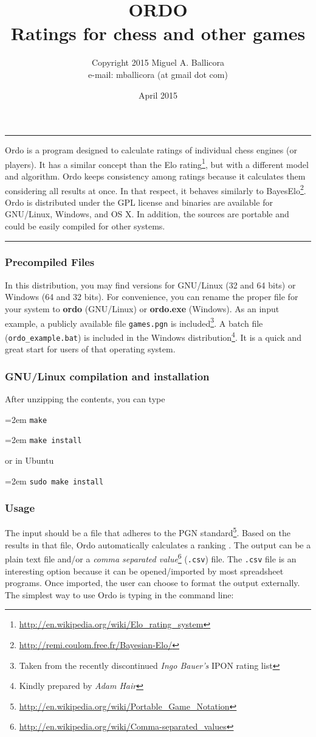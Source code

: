 \documentclass[12pt]{article}
\title{ORDO  \\ Ratings for chess and other games}
\author{Copyright \cpyrht{} 2015 Miguel A. Ballicora\\e-mail: mballicora (at gmail dot com)}
\date{April 2015}
\renewenvironment{abstract}{%
\hfill\begin{minipage}{0.95\textwidth}
\rule{\textwidth}{1pt}}
{\par\noindent\rule{\textwidth}{1pt}\end{minipage}}
\newcommand{\rgstrd} {\textsuperscript{\textregistered{}}}
\newcommand{\person} [1] {\textit{#1}}
\newcommand{\filename} [1] {\texttt{#1}}
\newcommand{\cmdln}[1]{
	\par
	\begingroup
		\leftskip=2em
		\addtolength{\rightskip}{0em}
		\noindent \small{\texttt{#1}}
		\par
	\endgroup
}
\begin{document}
   \maketitle

\begin{abstract}
Ordo is a program designed to calculate ratings of individual chess engines (or players).
It has a similar concept than the Elo rating\footnote{\url{http://en.wikipedia.org/wiki/Elo_rating_system}}, but with a different model and algorithm. 
Ordo keeps consistency among ratings because it calculates them considering all results at once.
In that respect, it behaves similarly to BayesElo\footnote{\url{http://remi.coulom.free.fr/Bayesian-Elo/}}.
Ordo is distributed under the GPL license and binaries are available for GNU/Linux, Windows\rgstrd{}, and OS X.
In addition, the sources are portable and could be easily compiled for other systems. 
\end{abstract}

\subsubsection*{Precompiled Files}
In this distribution, you may find versions for GNU/Linux (32 and 64 bits) or Windows\rgstrd{} (64 and 32 bits). 
For convenience, you can rename the proper file for your system to \textbf{ordo} (GNU/Linux) or \textbf{ordo.exe} (Windows\rgstrd{}). 
As an input example, a publicly available file \filename{games.pgn} is included\footnote{Taken from the recently discontinued \person{Ingo Bauer's} IPON rating list}. 
A batch file (\filename{ordo\_example.bat}) is included in the Windows\rgstrd{} distribution\footnote{Kindly prepared by \person{Adam Hair}}. 
It is a quick and great start for users of that operating system.

\subsubsection*{GNU/Linux compilation and installation}
After unzipping the contents, you can type
\cmdln{make}
\cmdln{make install}
or in Ubuntu
\cmdln{sudo make install}

\subsubsection*{Usage}
The input should be a file that adheres to the PGN standard\footnote{\url{http://en.wikipedia.org/wiki/Portable_Game_Notation}}. 
Based on the results in that file, Ordo automatically calculates a ranking . 
The output can be a plain text file and/or a \textit{comma separated value}\footnote{\url{http://en.wikipedia.org/wiki/Comma-separated_values}} (\filename{.csv}) file.
The \filename{.csv} file is an interesting option because it can be opened/imported by most spreadsheet programs. 
Once imported, the user can choose to format the output externally.
The simplest way to use Ordo is typing in the command line:
\end{document}
